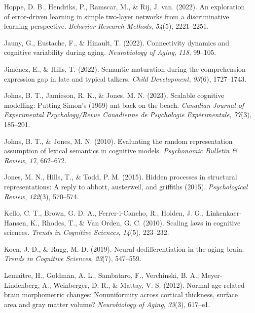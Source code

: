 \documentclass[
  man,floatsintext]{apa6}
\newlength{\cslhangindent}
\newlength{\cslentryspacingunit} %
\newenvironment{CSLReferences}[2] %
 {%
  \setlength{\parindent}{0pt}
  \ifodd #1
  \let\oldpar\par
  \def\par{\hangindent=\cslhangindent\oldpar}
  \fi
  \setlength{\parskip}{#2\cslentryspacingunit}
 }%
 {}
\begin{document}
\begin{CSLReferences}{1}{0}
\leavevmode{}%
Hoppe, D. B., Hendriks, P., Ramscar, M., \& Rij, J. van. (2022). An exploration of error-driven learning in simple two-layer networks from a discriminative learning perspective. \emph{Behavior Research Methods}, \emph{54}(5), 2221--2251.

\leavevmode{}%
Jauny, G., Eustache, F., \& Hinault, T. (2022). Connectivity dynamics and cognitive variability during aging. \emph{Neurobiology of Aging}, \emph{118}, 99--105.

\leavevmode{}%
Jiménez, E., \& Hills, T. (2022). Semantic maturation during the comprehension-expression gap in late and typical talkers. \emph{Child Development}, \emph{93}(6), 1727--1743.

\leavevmode{}%
Johns, B. T., Jamieson, R. K., \& Jones, M. N. (2023). {Scalable cognitive modelling: Putting Simon's (1969) ant back on the beach.} \emph{Canadian Journal of Experimental Psychology/Revue Canadienne de Psychologie Exp{é}rimentale}, \emph{77}(3), 185--201.

\leavevmode{}%
Johns, B. T., \& Jones, M. N. (2010). Evaluating the random representation assumption of lexical semantics in cognitive models. \emph{Psychonomic Bulletin \& Review}, \emph{17}, 662--672.

\leavevmode{}%
Jones, M. N., Hills, T., \& Todd, P. M. (2015). Hidden processes in structural representations: A reply to abbott, austerweil, and griffiths (2015). \emph{Psychological Review}, \emph{122}(3), 570--574.

\leavevmode{}%
Kello, C. T., Brown, G. D. A., Ferrer-i-Cancho, R., Holden, J. G., Linkenkaer-Hansen, K., Rhodes, T., \& Van Orden, G. C. (2010). {Scaling laws in cognitive sciences}. \emph{Trends in Cognitive Sciences}, \emph{14}(5), 223--232.

\leavevmode{}%
Koen, J. D., \& Rugg, M. D. (2019). Neural dedifferentiation in the aging brain. \emph{Trends in Cognitive Sciences}, \emph{23}(7), 547--559.

\leavevmode{}%
Lemaitre, H., Goldman, A. L., Sambataro, F., Verchinski, B. A., Meyer-Lindenberg, A., Weinberger, D. R., \& Mattay, V. S. (2012). Normal age-related brain morphometric changes: Nonuniformity across cortical thickness, surface area and gray matter volume? \emph{Neurobiology of Aging}, \emph{33}(3), 617--e1.


\end{CSLReferences}
\end{document}
